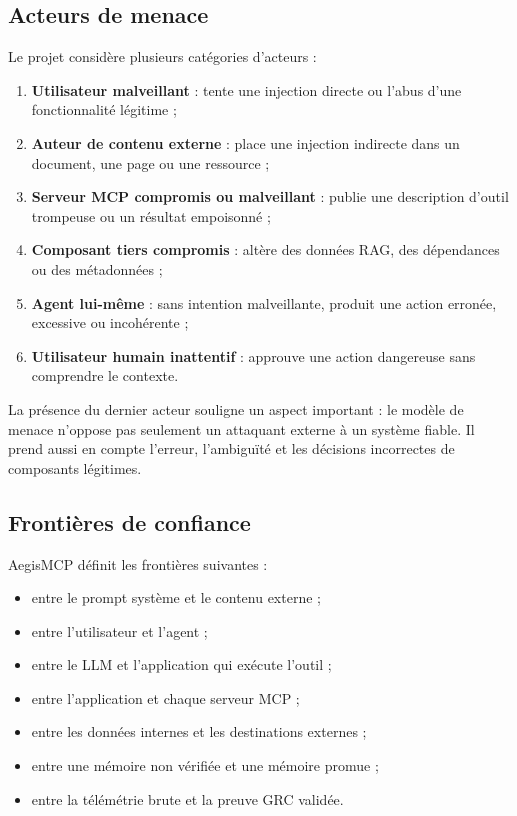 \subsection{Acteurs de menace}

Le projet considère plusieurs catégories d'acteurs :

\begin{enumerate}
    \item \textbf{Utilisateur malveillant} : tente une injection directe ou l'abus d'une fonctionnalité légitime ;
    \item \textbf{Auteur de contenu externe} : place une injection indirecte dans un document, une page ou une ressource ;
    \item \textbf{Serveur MCP compromis ou malveillant} : publie une description d'outil trompeuse ou un résultat empoisonné ;
    \item \textbf{Composant tiers compromis} : altère des données RAG, des dépendances ou des métadonnées ;
    \item \textbf{Agent lui-même} : sans intention malveillante, produit une action erronée, excessive ou incohérente ;
    \item \textbf{Utilisateur humain inattentif} : approuve une action dangereuse sans comprendre le contexte.
\end{enumerate}

La présence du dernier acteur souligne un aspect important : le modèle de menace n'oppose pas seulement un attaquant externe à un système fiable. Il prend aussi en compte l'erreur, l'ambiguïté et les décisions incorrectes de composants légitimes.

\subsection{Frontières de confiance}

AegisMCP définit les frontières suivantes :

\begin{itemize}
    \item entre le prompt système et le contenu externe ;
    \item entre l'utilisateur et l'agent ;
    \item entre le LLM et l'application qui exécute l'outil ;
    \item entre l'application et chaque serveur MCP ;
    \item entre les données internes et les destinations externes ;
    \item entre une mémoire non vérifiée et une mémoire promue ;
    \item entre la télémétrie brute et la preuve GRC validée.
\end{itemize}

